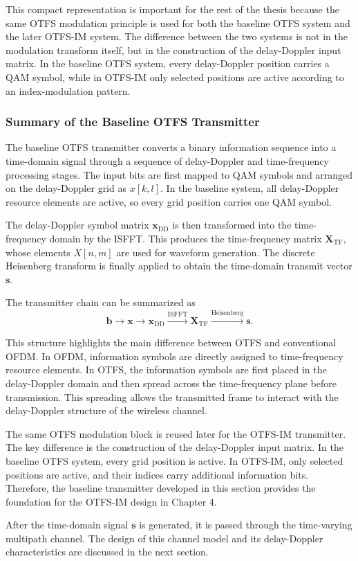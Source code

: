 This compact representation is important for the rest of the thesis because the same OTFS modulation principle is used for both the baseline OTFS system and the later OTFS-IM system. The difference between the two systems is not in the modulation transform itself, but in the construction of the delay-Doppler input matrix. In the baseline OTFS system, every delay-Doppler position carries a QAM symbol, while in OTFS-IM only selected positions are active according to an index-modulation pattern.

\subsubsection{Summary of the Baseline OTFS Transmitter}

The baseline OTFS transmitter converts a binary information sequence into a time-domain signal through a sequence of delay-Doppler and time-frequency processing stages. The input bits are first mapped to QAM symbols and arranged on the delay-Doppler grid as \(x[k,l]\). In the baseline system, all delay-Doppler resource elements are active, so every grid position carries one QAM symbol.

The delay-Doppler symbol matrix \(\mathbf{x}_{\mathrm{DD}}\) is then transformed into the time-frequency domain by the ISFFT. This produces the time-frequency matrix \(\mathbf{X}_{\mathrm{TF}}\), whose elements \(X[n,m]\) are used for waveform generation. The discrete Heisenberg transform is finally applied to obtain the time-domain transmit vector \(\mathbf{s}\).

The transmitter chain can be summarized as
\begin{equation}
    \mathbf{b}
    \rightarrow
    \mathbf{x}
    \rightarrow
    \mathbf{x}_{\mathrm{DD}}
    \xrightarrow{\mathrm{ISFFT}}
    \mathbf{X}_{\mathrm{TF}}
    \xrightarrow{\mathrm{Heisenberg}}
    \mathbf{s}.
\end{equation}

This structure highlights the main difference between OTFS and conventional OFDM. In OFDM, information symbols are directly assigned to time-frequency resource elements. In OTFS, the information symbols are first placed in the delay-Doppler domain and then spread across the time-frequency plane before transmission. This spreading allows the transmitted frame to interact with the delay-Doppler structure of the wireless channel.

The same OTFS modulation block is reused later for the OTFS-IM transmitter. The key difference is the construction of the delay-Doppler input matrix. In the baseline OTFS system, every grid position is active. In OTFS-IM, only selected positions are active, and their indices carry additional information bits. Therefore, the baseline transmitter developed in this section provides the foundation for the OTFS-IM design in Chapter 4.

After the time-domain signal \(\mathbf{s}\) is generated, it is passed through the time-varying multipath channel. The design of this channel model and its delay-Doppler characteristics are discussed in the next section.
